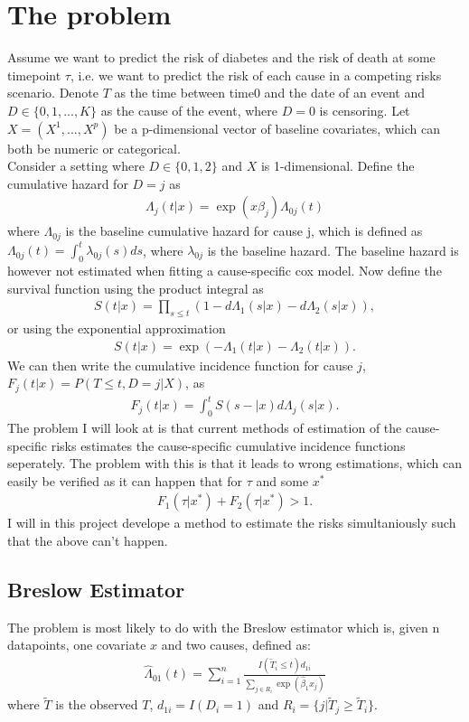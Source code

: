 \documentclass[11pt]{article}
\begin{document}
\section{The problem}
\label{sec:orgc9ee5e9}
Assume we want to predict the risk of diabetes and the risk of death at some timepoint \(\tau\), i.e. we want to predict the risk of each cause in a competing risks scenario. Denote \(T\) as the time between time0 and the date of an event and \(D\in\{0,1,...,K\}\) as the cause of the event, where \(D = 0\) is censoring. Let \(X = (X^1,...,X^p)\) be a p-dimensional vector of baseline covariates, which can both be numeric or categorical.\\[0pt]
Consider a setting where \(D\in\{0,1,2\}\) and \(X\) is 1-dimensional. Define the cumulative hazard for \(D = j\) as
\begin{align*}
\Lambda_j(t|x) = \exp(x\beta_j)\Lambda_{0j}(t)
\end{align*}
where \(\Lambda_{0j}\) is the baseline cumulative hazard for cause j, which is defined as \(\Lambda_{0j}(t) = \int_0^t \lambda_{0j}(s)ds\), where \(\lambda_{0j}\) is the baseline hazard. The baseline hazard is however not estimated when fitting a cause-specific cox model. Now define the survival function using the product integral as
\begin{align*}
S(t|x) = \prod_{s \leq t}\left(1-d\Lambda_1(s|x)-d\Lambda_2(s|x)\right),
\end{align*}
or using the exponential approximation
\begin{align*}
S(t|x) = \exp(-\Lambda_1(t|x)-\Lambda_2(t|x)).
\end{align*}
We can then write the cumulative incidence function for cause \(j\), \(F_j(t|x) = P(T\leq t, D = j|X)\), as
\begin{align*}
F_j(t|x) = \int_0^t S(s-|x)d\Lambda_j(s|x).
\end{align*}
The problem I will look at is that current methods of estimation of the cause-specific risks estimates the cause-specific cumulative incidence functions seperately. The problem with this is that it leads to wrong estimations, which can easily be verified as it can happen that for \(\tau\) and some \(x^*\)
\begin{align}
F_1(\tau|x^*)+F_2(\tau|x^*)>1.
\end{align}
I will in this project develope a method to estimate the risks simultaniously such that the above can't happen.

\subsection{Breslow Estimator}
\label{sec:orgd845e7f}
The problem is most likely to do with the Breslow estimator which is, given n datapoints, one covariate \(x\) and two causes, defined as:
\begin{align*}
\hat{\Lambda}_{01}(t) = \sum_{i = 1}^n\frac{I(\tilde{T}_i\leq t)d_{1i}}{\sum_{j\in R_i}\exp(\hat{\beta}_1x_j)}
\end{align*}
where \(\tilde{T}\) is the observed \(T\), \(d_{1i} = I(D_i = 1)\) and \(R_i = \{j|\tilde{T}_j \geq \tilde{T}_i\}\). 
\end{document}
